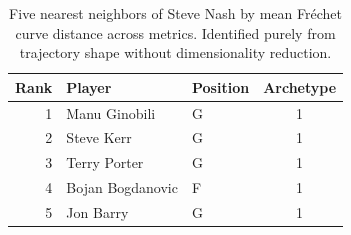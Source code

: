 \begin{table}[htbp]
  \centering\small
  \begin{tabular}{rllc}
    \toprule
    Rank & Player & Position & Archetype \\
    \midrule
    1 & Manu Ginobili & G & 1 \\
    2 & Steve Kerr & G & 1 \\
    3 & Terry Porter & G & 1 \\
    4 & Bojan Bogdanovic & F & 1 \\
    5 & Jon Barry & G & 1 \\
    \bottomrule
  \end{tabular}
  \caption{Five nearest neighbors of Steve Nash by mean Fr\'{e}chet curve distance across metrics. Identified purely from trajectory shape without dimensionality reduction.}
  \label{tab:Steve_Nash_frechet_curve_neighbors}
\end{table}

